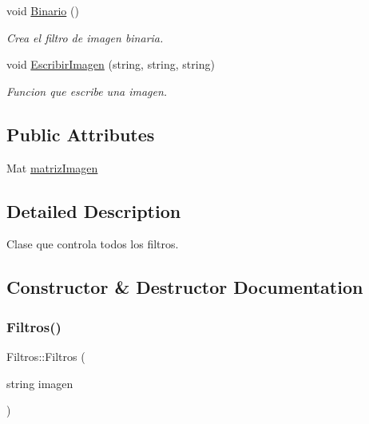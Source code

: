 \begin{DoxyCompactItemize}
void \hyperlink{class_filtros_a85e035d3ce1a721331aba30535487a57}{Binario} ()
\begin{DoxyCompactList}\small\item\em Crea el filtro de imagen binaria. \end{DoxyCompactList}\item 
void \hyperlink{class_filtros_a69d9e93f385d769a769b25033472bd67}{Escribir\+Imagen} (string, string, string)
\begin{DoxyCompactList}\small\item\em Funcion que escribe una imagen. \end{DoxyCompactList}\end{DoxyCompactItemize}
\subsection*{Public Attributes}
\begin{DoxyCompactItemize}
\item 
Mat \hyperlink{class_filtros_a7bb45c07cea0bed3d4a4b8a7cca38fe9}{matriz\+Imagen}
\end{DoxyCompactItemize}


\subsection{Detailed Description}
Clase que controla todos los filtros. 

\subsection{Constructor \& Destructor Documentation}
\mbox{\label{class_filtros_ada24dd279d9c0e4c95738162866bd261}} 
\subsubsection{\texorpdfstring{Filtros()}{Filtros()}\hspace{0.1cm}{\footnotesize\ttfamily [1/2]}}
{\footnotesize\ttfamily Filtros\+::\+Filtros (\begin{DoxyParamCaption}\item[{string}]{imagen }\end{DoxyParamCaption})\hspace{0.3cm}{\ttfamily [inline]}}



